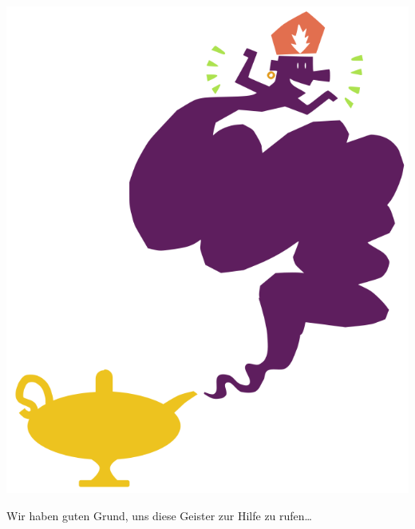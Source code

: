 \documentclass[aspectratio=169,usenames,dvipsnames]{beamer}
\begin{document}
\begin{frame}
\begin{minipage}{0.333\textwidth}
\begin{center}
\includegraphics[keepaspectratio, height=0.75\textheight]{images/genie}
\end{center}
\end{minipage}\qquad\qquad\qquad\begin{minipage}{0.4\textwidth}
\begin{center}
\huge
Wir haben guten Grund, uns diese Geister zur Hilfe zu rufen\dots
\end{center}
\end{minipage}
\end{frame}
\end{document}
